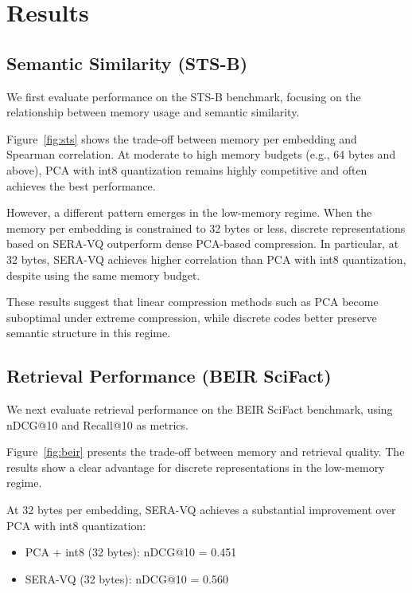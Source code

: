 \documentclass{article}
\begin{document}
\section{Results}

\subsection{Semantic Similarity (STS-B)}

We first evaluate performance on the STS-B benchmark, focusing on the relationship between memory usage and semantic similarity.

Figure~\ref{fig:sts} shows the trade-off between memory per embedding and Spearman correlation. At moderate to high memory budgets (e.g., 64 bytes and above), PCA with int8 quantization remains highly competitive and often achieves the best performance.

However, a different pattern emerges in the low-memory regime. When the memory per embedding is constrained to 32 bytes or less, discrete representations based on SERA-VQ outperform dense PCA-based compression. In particular, at 32 bytes, SERA-VQ achieves higher correlation than PCA with int8 quantization, despite using the same memory budget.

These results suggest that linear compression methods such as PCA become suboptimal under extreme compression, while discrete codes better preserve semantic structure in this regime.

\subsection{Retrieval Performance (BEIR SciFact)}

We next evaluate retrieval performance on the BEIR SciFact benchmark, using nDCG@10 and Recall@10 as metrics.

Figure~\ref{fig:beir} presents the trade-off between memory and retrieval quality. The results show a clear advantage for discrete representations in the low-memory regime.

At 32 bytes per embedding, SERA-VQ achieves a substantial improvement over PCA with int8 quantization:

\begin{itemize}
    \item PCA + int8 (32 bytes): nDCG@10 = 0.451
    \item SERA-VQ (32 bytes): nDCG@10 = 0.560
\end{itemize}
\end{document}
